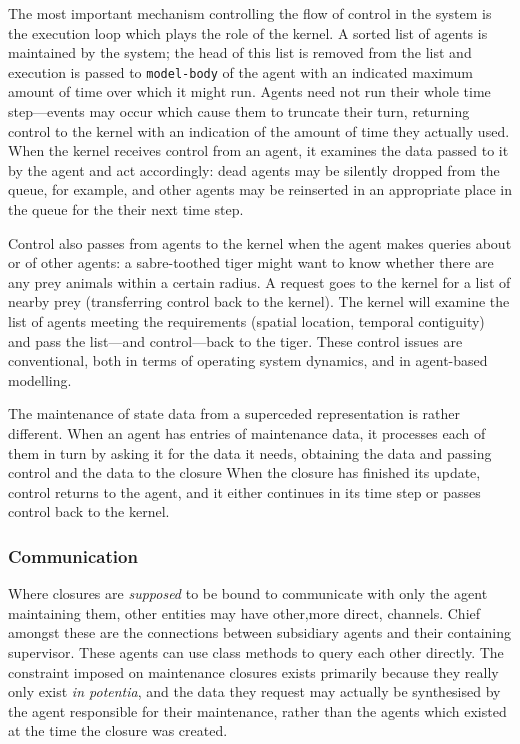 The most important mechanism controlling the flow of control in the
system is the execution loop which plays the role of the kernel. A
sorted list of agents is maintained by the system; the head of this
list is removed from the list and execution is passed to
\texttt{model-body} of the agent with an indicated maximum amount of
time over which it might run.  Agents need not run their whole time
step---events may occur which cause them to truncate their turn,
returning control to the kernel with an indication of the amount of
time they actually used.  When the kernel receives control from an
agent, it examines the data passed to it by the agent and act
accordingly: dead agents may be silently dropped from the queue, for
example, and other agents may be reinserted in an appropriate place in
the queue for the their next time step.

Control also passes from agents to the kernel when the agent makes
queries about or of other agents: a sabre-toothed tiger might want to
know whether there are any prey animals within a certain radius.  A
request goes to the kernel for a list of nearby prey (transferring
control back to the kernel).  The kernel will examine the list of
agents meeting the requirements (spatial location, temporal
contiguity) and pass the list---and control---back to the tiger.
These control issues are conventional, both in terms of operating
system dynamics, and in agent-based modelling.

The maintenance of state data from a superceded representation is
rather different. When an agent has entries of maintenance data, it
processes each of them in turn by asking it for the data it needs,
obtaining the data and passing control and the data to the closure
When the closure has finished its update, control returns to the
agent, and it either continues in its time step or passes control back
to the kernel.

\subsubsection{Communication}

Where closures are \emph{supposed} to be bound to communicate with
only the agent maintaining them, other entities may have other,more
direct, channels. Chief amongst these are the connections between
subsidiary agents and their containing supervisor.  These agents can
use class methods to query each other directly. The constraint imposed
on maintenance closures exists primarily because they really only
exist \emph{in potentia}, and the data they request may actually be
synthesised by the agent responsible for their maintenance, rather
than the agents which existed at the time the closure was created.

